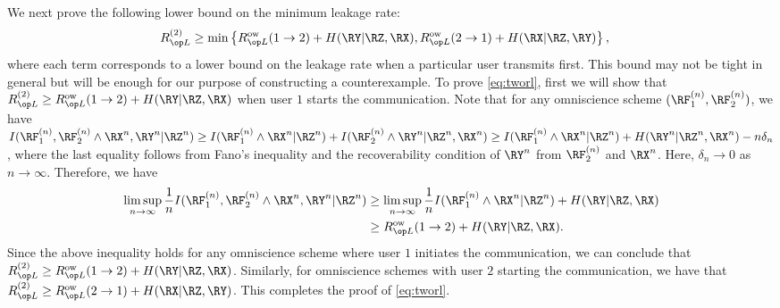 We next prove the following lower bound on the minimum leakage rate: 
\begin{align}
         \rl^{(2)}\geq \min & \left\lbrace \rl^{\text{ow}} (1 \rightarrow 2)+ H(\RY | \RZ, \RX),  
         \rl^{\text{ow}} (2 \rightarrow 1)+ H(\RX | \RZ, \RY)\right\rbrace,\label{eq:tworl}
\end{align}
where each term corresponds to a lower bound on the leakage rate when a particular user transmits first.  This bound may not be tight in general but will be enough for our purpose of constructing a counterexample. To prove \eqref{eq:tworl}, first we will show that $\rl^{(2)}\geq \rl^{\text{ow}} (1 \rightarrow 2)+ H(\RY | \RZ, \RX)$ when user $1$ starts the communication. Note that for any omniscience scheme $(\RF_1^{(n)},\RF_2^{(n)})$, we have $I(\RF_1^{(n)},\RF_2^{(n)} \wedge \RX^n,\RY^n|\RZ^n) \geq I(\RF_1^{(n)} \wedge \RX^n|\RZ^n) + I(\RF_2^{(n)} \wedge \RY^n|\RZ^n,\RX^n) \geq I(\RF_1^{(n)} \wedge \RX^n|\RZ^n) + H(\RY^n|\RZ^n,\RX^n)- n\delta_n$, where the last equality follows from Fano's inequality and the recoverability condition of $\RY^n$ from $\RF_2^{(n)}$ and $\RX^n$. Here, $\delta_n \to 0$ as $n \to \infty$. Therefore, we have 
\begin{align*}
\limsup_{n \to \infty} \frac{1}{n} I(\RF_1^{(n)},\RF_2^{(n)} \wedge \RX^n,\RY^n|\RZ^n) & \geq \limsup_{n \to \infty}\frac{1}{n} I(\RF_1^{(n)} \wedge \RX^n|\RZ^n) + H(\RY|\RZ,\RX)\\
&\geq \rl^{\text{ow}} (1 \rightarrow 2)+ H(\RY | \RZ, \RX).
\end{align*}
Since the above inequality holds for any omniscience scheme where user $1$ initiates the communication, we can conclude that $\rl^{(2)}\geq \rl^{\text{ow}} (1 \rightarrow 2)+ H(\RY | \RZ, \RX)$. Similarly, for  omniscience schemes with user $2$ starting the communication, we have that $\rl^{(2)}\geq \rl^{\text{ow}} (2 \rightarrow 1)+ H(\RX | \RZ, \RY)$. This completes the proof of \eqref{eq:tworl}.

